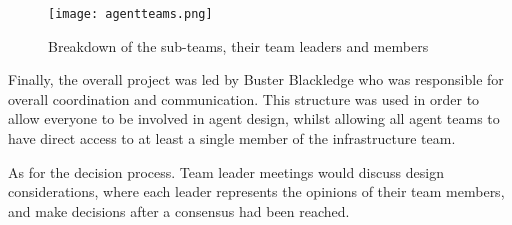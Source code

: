 \begin{figure}[htb]
    \centering
    \texttt{[image: agentteams.png]}
    \caption{Breakdown of the sub-teams, their team leaders and members}
    \label{fig:subteams}
\end{figure}


Finally, the overall project was led by Buster Blackledge who was responsible for overall coordination and communication. This structure was used in order to allow everyone to be involved in agent design, whilst allowing all agent teams to have direct access to at least a single member of the infrastructure team. 

As for the decision process. Team leader meetings would discuss design considerations, where each leader represents the opinions of their team members, and make decisions after a consensus had been reached. 
